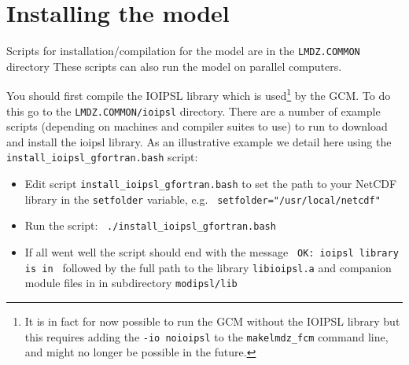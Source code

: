 \section{Installing the model}
Scripts for installation/compilation for the model are in the {\tt LMDZ.COMMON} directory
These scripts can also run the model on parallel computers. 

You should first compile the IOIPSL library which is used\footnote{It is in fact for now possible to run the GCM without the IOIPSL library but this requires adding the {\tt -io noioipsl} to the {\tt makelmdz\_fcm} command line, and might no longer be possible in the future.} by the GCM. To do this go to the {\tt LMDZ.COMMON/ioipsl} directory. There are a number of example scripts (depending on machines and compiler suites to use) to run to download and install the ioipsl library. As an illustrative example we detail here using the {\tt install\_ioipsl\_gfortran.bash} script:
\begin{itemize}
\item Edit script {\tt install\_ioipsl\_gfortran.bash} to set the path to your NetCDF library in the {\tt setfolder} variable, e.g. \verb+ setfolder="/usr/local/netcdf"+
\item Run the script: \verb+ ./install_ioipsl_gfortran.bash+
\item If all went well the script should end with the message \verb+ OK: ioipsl library is in + followed by the full path to the library {\tt libioipsl.a} and companion module files in in subdirectory \verb+modipsl/lib+
\end{itemize}

